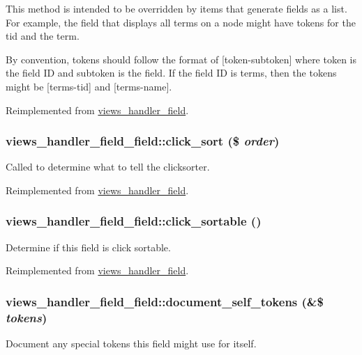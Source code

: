 This method is intended to be overridden by items that generate fields as a list. For example, the field that displays all terms on a node might have tokens for the tid and the term.

By convention, tokens should follow the format of \mbox{[}token-\/subtoken\mbox{]} where token is the field ID and subtoken is the field. If the field ID is terms, then the tokens might be \mbox{[}terms-\/tid\mbox{]} and \mbox{[}terms-\/name\mbox{]}. 

Reimplemented from \hyperlink{classviews__handler__field_ac61cc83a4c8c579993a254b5b1e16cbc}{views\_\-handler\_\-field}.\hypertarget{classviews__handler__field__field_aaded59c09fb313c01398a7652d92ae0d}{
\subsubsection[{click\_\-sort}]{\setlength{\rightskip}{0pt plus 5cm}views\_\-handler\_\-field\_\-field::click\_\-sort (\$ {\em order})}}
\label{classviews__handler__field__field_aaded59c09fb313c01398a7652d92ae0d}
Called to determine what to tell the clicksorter. 

Reimplemented from \hyperlink{classviews__handler__field_a1c8cabe835ba05ed045c8f6eec6a36b8}{views\_\-handler\_\-field}.\hypertarget{classviews__handler__field__field_a02da80b019b7cfeb7d00571b7b2b8b6d}{
\subsubsection[{click\_\-sortable}]{\setlength{\rightskip}{0pt plus 5cm}views\_\-handler\_\-field\_\-field::click\_\-sortable ()}}
\label{classviews__handler__field__field_a02da80b019b7cfeb7d00571b7b2b8b6d}
Determine if this field is click sortable. 

Reimplemented from \hyperlink{classviews__handler__field_a22ef16d2b34823a3d12f273d34278b00}{views\_\-handler\_\-field}.\hypertarget{classviews__handler__field__field_a1e4563c5085f7188e85278770098bee0}{
\subsubsection[{document\_\-self\_\-tokens}]{\setlength{\rightskip}{0pt plus 5cm}views\_\-handler\_\-field\_\-field::document\_\-self\_\-tokens (\&\$ {\em tokens})}}
\label{classviews__handler__field__field_a1e4563c5085f7188e85278770098bee0}
Document any special tokens this field might use for itself.


